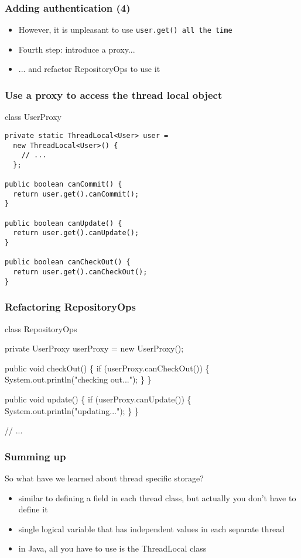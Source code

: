 \documentclass{beamer}
\begin{document}
\begin{frame}
  \frametitle{Adding authentication (4)}

\begin{itemize}
\item However, it is unpleasant to use \tt{}user.get()\normalfont{} all the time
\pause
\item Fourth step: introduce a proxy...
\item ... and refactor RepositoryOps to use it
\end{itemize}

\end{frame}

\begin{frame}[fragile]
  \frametitle{Use a proxy to access the thread local object}

\begin{block}{class UserProxy}
\begin{verbatim}
private static ThreadLocal<User> user =
  new ThreadLocal<User>() {
    // ...
  };

public boolean canCommit() {
  return user.get().canCommit();
}

public boolean canUpdate() {
  return user.get().canUpdate();
}

public boolean canCheckOut() {
  return user.get().canCheckOut();
}
\end{verbatim}
\end{block}

\end{frame}

\begin{frame}[fragile]
  \frametitle{Refactoring RepositoryOps}

\begin{block}{class RepositoryOps}
\begin{semiverbatim}
\alert{private UserProxy userProxy = new UserProxy();}

public void checkOut() \{
  if (\alert{userProxy.canCheckOut()}) \{
    System.out.println("checking out...");
  \}
\}

public void update() \{
  if (\alert{userProxy.canUpdate()}) \{
    System.out.println("updating...");
  \}
\}

// ...
\end{semiverbatim}
\end{block}

\end{frame}

\begin{frame}
  \frametitle{Summing up}

So what have we learned about thread specific storage?
\begin{itemize}
\item similar to defining a field in each thread class, but actually you don't have to define it
\item single logical variable that has independent values in each separate thread
\item in Java, all you have to use is the ThreadLocal class
\end{itemize}

\end{frame}
\end{document}
